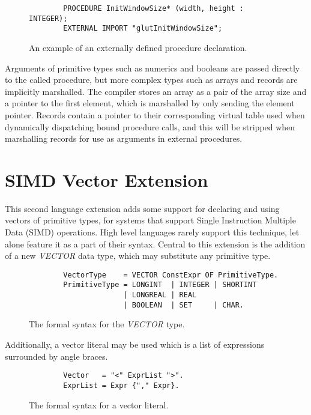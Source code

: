 \documentclass[a4paper,11pt]{article}
\begin{document}
    \begin{figure}[h]
    \begin{lstlisting}
        PROCEDURE InitWindowSize* (width, height : INTEGER);
        EXTERNAL IMPORT "glutInitWindowSize";
    \end{lstlisting}
    \caption{An example of an externally defined procedure declaration.}
    \end{figure}

    \noindent
    Arguments of primitive types such as numerics and booleans are passed directly to the called procedure, but more complex types such as arrays and records are implicitly marshalled. The compiler stores an array as a pair of the array size and a pointer to the first element, which is marshalled by only sending the element pointer. Records contain a pointer to their corresponding virtual table used when dynamically dispatching bound procedure calls, and this will be stripped when marshalling records for use as arguments in external procedures.

    \section{SIMD Vector Extension}
    This second language extension adds some support for declaring and using vectors of primitive types, for systems that support Single Instruction Multiple Data (SIMD) operations. High level languages rarely support this technique, let alone feature it as a part of their syntax. Central to this extension is the addition of a new \emph{VECTOR} data type, which may substitute any primitive type.

    \begin{figure}[h]
    \begin{lstlisting}
        VectorType    = VECTOR ConstExpr OF PrimitiveType.
        PrimitiveType = LONGINT  | INTEGER | SHORTINT
                      | LONGREAL | REAL 
                      | BOOLEAN  | SET     | CHAR.
    \end{lstlisting}
    \caption{The formal syntax for the \emph{VECTOR} type.}
    \end{figure}

    \noindent
    Additionally, a vector literal may be used which is a list of expressions surrounded by angle braces.

    \begin{figure}[h]
    \begin{lstlisting}
        Vector   = "<" ExprList ">".
        ExprList = Expr {"," Expr}.
    \end{lstlisting}
    \caption{The formal syntax for a vector literal.}
    \end{figure}
\end{document}
